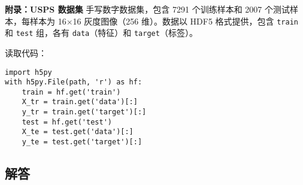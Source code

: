 \documentclass[UTF8]{report}
\theoremstyle{MyLineTheoremStyle} %
\theoremstyle{MyBlockTheoremStyle} %
\theoremstyle{MySubsubsectionStyle} %
\begin{document}
\textbf{附录：USPS 数据集}  
手写数字数据集，包含 7291 个训练样本和 2007 个测试样本，每样本为 16×16 灰度图像（256 维）。数据以 HDF5 格式提供，包含 \texttt{train} 和 \texttt{test} 组，各有 \texttt{data}（特征）和 \texttt{target}（标签）。

读取代码：
\begin{lstlisting}
import h5py
with h5py.File(path, 'r') as hf:
    train = hf.get('train')
    X_tr = train.get('data')[:]
    y_tr = train.get('target')[:]
    test = hf.get('test')
    X_te = test.get('data')[:]
    y_te = test.get('target')[:]
\end{lstlisting}

\subsection{解答}
\end{document}
